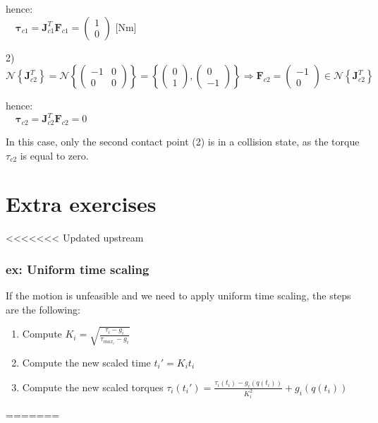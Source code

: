 \documentclass[a4paper,12pt]{article}
\begin{document}
\begin{center}
    hence:\\
    $\quad \boldsymbol{\tau}_{c1} = \boldsymbol{J}_{c1}^T \boldsymbol{F}_{c1} = \left(\begin{array}{c}
        1 \\
        0
        \end{array}\right) \text{ [Nm]}$
\end{center}

\begin{center}
    2) $\mathcal{N}\left\{\boldsymbol{J}_{c2}^T\right\} = \mathcal{N}\left\{\left(\begin{array}{cc}
        -1 & 0 \\
        0 & 0
        \end{array}\right)\right\} = \left\{\left(\begin{array}{cc} 0 \\ 1 \end{array}\right), \left(\begin{array}{cc} 0 \\ -1 \end{array}\right)\right\}
        \Rightarrow \boldsymbol{F}_{c2} = \left(\begin{array}{c}
        -1 \\
        0
        \end{array}\right) \in \mathcal{N}\left\{\boldsymbol{J}_{c2}^T\right\}$
    \end{center}
    
    \begin{center}
        hence:\\
        $\quad \boldsymbol{\tau}_{c2} = \boldsymbol{J}_{c2}^T \boldsymbol{F}_{c2} = 0$
    \end{center}

In this case, only the second contact point (2) is in a collision state, as the torque $\tau_{c2}$ is equal to zero.





\section{Extra exercises}
<<<<<<< Updated upstream
\subsubsection{ex: Uniform time scaling}
If the motion is unfeasible and we need to apply uniform time scaling, 
the steps are the following:
\begin{enumerate}
    \item Compute $K_i = \sqrt{\frac{\tau_i - g_i}{\tau_{max_i} - g_i}}$
    \item Compute the new scaled time $t_i' = K_i t_i$
    \item Compute the new scaled torques $\tau_i(t_i') = \frac{\tau_i(t_i) - g_i(q(t_i))}{K_i^2} + g_i(q(t_i))$
\end{enumerate}
=======
\end{document}

